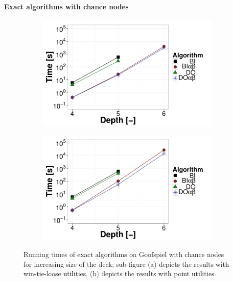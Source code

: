 \paragraph{Exact algorithms with chance nodes}

\begin{figure}[t]
\centering
	\begin{subfigure}{0.49\textwidth}
 		\includegraphics[width=1\textwidth]{figures/GS-BT-NN.pdf}\caption{}\label{fig:off:res:gsn-bt}
 	\end{subfigure}
	\begin{subfigure}{0.49\textwidth}
 		\includegraphics[width=1\textwidth]{figures/GS-BF-NN.pdf}\caption{}\label{fig:off:res:gsn-bf}
 	\end{subfigure}
\caption{Running times of exact algorithms on Goofspiel with chance nodes for increasing size of the deck; sub-figure (a) depicts the results with win-tie-loose utilities, (b) depicts the results with point utilities.} \label{fig:off:res:gsn}
\end{figure}

